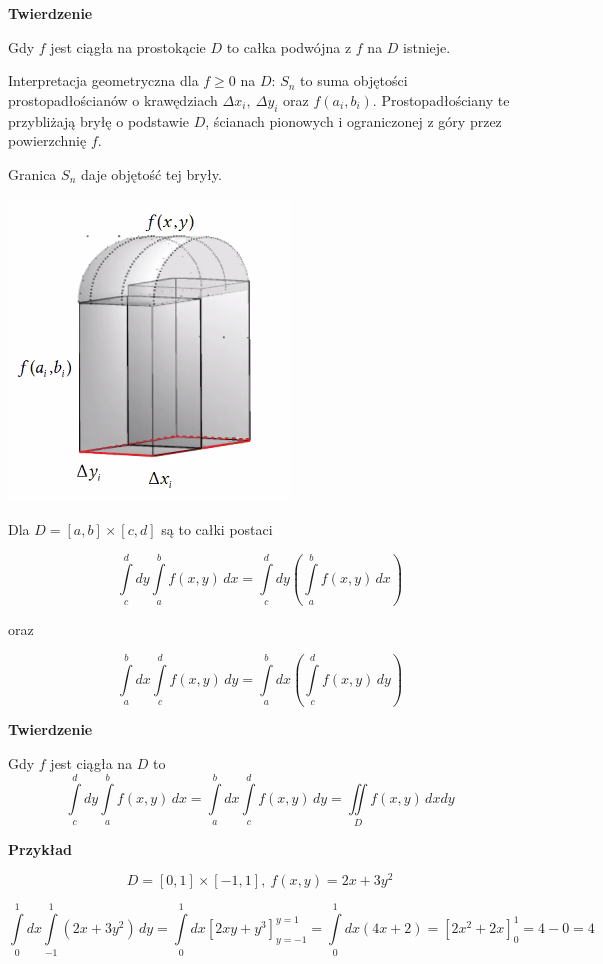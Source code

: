 \textbf{Twierdzenie}

Gdy $f$ jest ciągła na prostokącie $D$ to całka podwójna z $f$ na $D$ istnieje.
\bigskip

Interpretacja geometryczna dla $ f \geq 0 $ na $D$: $S_n$ to suma objętości prostopadłościanów o krawędziach $ \Delta x_i, \ \Delta y_i $ oraz $ f(a_i, b_i) $.
Prostopadłościany te przybliżają bryłę o podstawie $D$, ścianach pionowych i ograniczonej z góry przez powierzchnię $f$.

Granica $S_n$ daje objętość tej bryły.

\begin{center}
    \includegraphics[scale=0.5]{img/prostowalec.png}
\end{center}

Dla $ D = [a,b] \times [c,d] $ są to całki postaci

\[ \int\limits_c^d dy \int\limits_{a}^{b} f(x,y) \, dx = \int\limits_{c}^{d} dy \left( \int\limits_{a}^{b} f(x,y) \, dx \right) \]
\begin{center}oraz \end{center}
\[ \int\limits_a^b dx \int\limits_{c}^{d} f(x,y) \, dy = \int\limits_{a}^{b} dx \left( \int\limits_{c}^{d} f(x,y) \, dy \right) \]

\textbf{Twierdzenie}

Gdy $f$ jest ciągła na $D$ to
\[ \int\limits_{c}^{d} dy \int\limits_{a}^{b} f(x,y) \, dx = \int\limits_{a}^{b} dx \int\limits_{c}^{d} f(x,y) \, dy = \iint\limits_D f(x,y) \, dxdy \]
\medskip

\textbf{Przykład}

\[ D = [0,1] \times [-1,1], \ f(x,y) = 2x + 3y^2 \]

\[ \int\limits_{0}^{1} dx \int\limits_{-1}^{1} (2x+3y^2) \, dy = \int\limits_{0}^{1} dx \left[ 2xy + y^3 \right]_{y = -1}^{y=1} 
= \int\limits_{0}^{1} dx (4x+2) = \left[ 2x^2 + 2x \right]_0^1 = 4 - 0 = 4 \]


